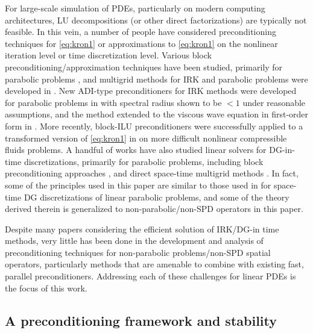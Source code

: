 \documentclass[review]{siamart}
\begin{document}
For large-scale simulation of PDEs, particularly on modern computing architectures,
LU decompositions (or other direct factorizations) are typically not feasible. In this
vein, a number of people have considered preconditioning techniques for \eqref{eq:kron1}
or approximations to \eqref{eq:kron1} on the nonlinear iteration level or time
discretization level. Various block preconditioning/approximation techniques
have been studied, primarily for parabolic problems
\cite{houwen97b,Houwen97c,nissen11,mardel07,staff06,hoffmann97,jay00}, and
multigrid methods for IRK and parabolic problems were developed in \cite{vanlent05}.
New ADI-type preconditioners for IRK methods were developed for parabolic problems
in \cite{chen14} with spectral radius shown to be $<1$ under reasonable assumptions,
and the method extended to the viscous wave equation in first-order form in
\cite{chen16}. More recently, block-ILU preconditioners were successfully applied
to a transformed version of \eqref{eq:kron1} in \cite{pazner17} on more difficult
nonlinear compressible fluids problems.
A handful of works have also studied linear solvers for DG-in-time discretizations,
primarily for parabolic problems, including block preconditioning approaches
\cite{exh,8jp,27n}, and direct space-time multigrid methods
\cite{gander2016analysis}. In fact, some of the principles used in this paper
are similar to those used in \cite{exh} for space-time DG discretizations of
linear parabolic problems, and some of the theory derived therein is generalized
to non-parabolic/non-SPD operators in this paper.

Despite many papers considering the efficient solution of IRK/DG-in time methods,
very little has been done in the development and analysis of preconditioning techniques
for non-parabolic problems/non-SPD spatial operators, particularly methods that are
amenable to combine with existing fast, parallel preconditioners. Addressing each
of these challenges for linear PDEs is the focus of this work.

\subsection{A preconditioning framework and stability}\label{sec:intro:stab}
\end{document}
